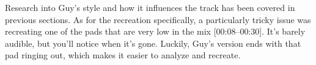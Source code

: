 %
%

Research into Guy's style and how it influences the track has been covered in previous sections. As for the recreation specifically, a particularly tricky issue was recreating one of the pads that are very low in the mix [00:08--00:30]. It's barely audible, but you'll notice when it's gone. Luckily, Guy's version ends with that pad ringing out, which makes it easier to analyze and recreate.
